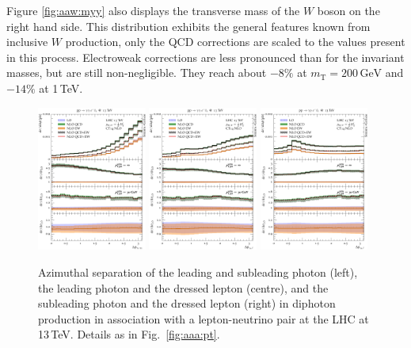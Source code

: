 Figure \ref{fig:aaw:myy} also displays the transverse 
mass of the $W$ boson on the right hand side. 
This distribution exhibits the general features known 
from inclusive $W$ production, only the QCD corrections 
are scaled to the values present in this process.
Electroweak corrections are less pronounced than for 
the invariant masses, but are still non-negligible. 
They reach about $-8\%$ at $m_\text{T}=200\,\text{GeV}$ 
and $-14\%$ at 1\,TeV.

\begin{figure}[t!]
  \centering
  \includegraphics[width=0.32\textwidth]{figs_aaw/dphi_y1_y2}
  \includegraphics[width=0.32\textwidth]{figs_aaw/dphi_y1_l1}
  \includegraphics[width=0.32\textwidth]{figs_aaw/dphi_y2_l1}
  \caption{
    Azimuthal separation of the leading and subleading photon (left),
    the leading photon and the dressed lepton (centre), and the subleading 
    photon and the dressed lepton (right)
    in diphoton production in association with a lepton-neutrino pair 
    at the LHC at 13\,TeV. 
    Details as in Fig.\ \ref{fig:aaa:pt}.
    \label{fig:aaw:dphi}
  }
\end{figure}

